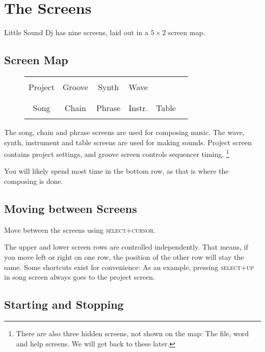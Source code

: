 \chapter{The Screens}
Little Sound Dj has nine screens, laid out in a \begin{math} 5 \times 2 \end{math} screen map.

\section{Screen Map}

\begin{figure}[htbp]
\centering
\begin{tabular}{|c|c|c|c|c|l}
	\cline{0-3}
    & & & \\
    Project & Groove & Synth & Wave \\
    & & & \\
	\cline{0-4}
	& & & & & \\
	Song & Chain & Phrase & Instr. & Table  & \\
	& & & & & \\
	\cline{0-4}
\end{tabular}
\end{figure}

The song, chain and phrase screens are used for composing music. The wave, synth,
instrument and table screens are used for making sounds.
Project screen contains project settings, and groove screen controls sequencer timing.
\footnote{There are also three hidden
screens, not shown on the map: The file, word and help screens. We will get back to these later.}

You will likely spend most time in the bottom row, as that is where the composing is done.

\section{Moving between Screens}

Move between the screens using \textsc{select+cursor}.

The upper and lower screen rows are controlled independently. That means, if you move
left or right on one row, the position of the other row will stay the same.
Some shortcuts exist for convenience: As an example, pressing \textsc{select+up}
in song screen always goes to the project screen.

\section{Starting and Stopping}

